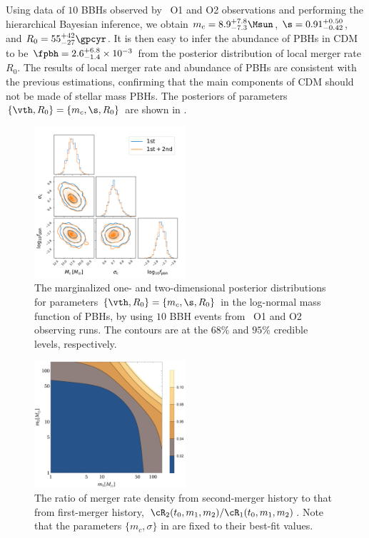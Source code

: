 \documentclass[
reprint,           %
superscriptaddress,%
amsmath,           %
amssymb,           %
aps,               %
prd,               %
notitlepage,       %
longbibliography,  %
floatfix,          %
showkeys,          %
]{revtex4-1}
\begin{document}
Using data of $10$ BBHs observed by \lvc\ O1 and O2 observations and performing
the hierarchical Bayesian inference, we obtain $m_c =8.9^{+7.8}_{-7.3} \Msun$,
$\s = 0.91^{+0.50}_{-0.42}$, and $R_0 = 55^{+42}_{-27} \gpcyr$.
It is then easy to infer the abundance of PBHs in CDM to be 
$\fpbh = 2.6^{+6.8}_{-1.4} \times 10^{-3}$ from the posterior distribution of 
local merger rate $R_0$.
The results of local merger rate and abundance of PBHs are consistent with
the previous estimations, confirming that the main components of CDM should
not be made of stellar mass PBHs.
The posteriors of parameters $\{\vth, R_0\} = \{m_c, \s, R_0\}$ are shown 
in .
\begin{figure}[htbp!]
	\centering
	\includegraphics[width=0.5\textwidth]{post-log.pdf}
	\caption{\label{posterior-log}
		The marginalized one- and two-dimensional posterior distributions for 
		parameters $\{\vth, R_0\} = \{m_c, \s, R_0\}$ in the log-normal mass function of PBHs, by using $10$ BBH events from \lvc\ O1 and O2 observing runs.
		The contours are at the $68\%$ and $95\%$ credible levels, respectively. 
	}
\end{figure}

\begin{figure}[htbp!]
	\centering
	\includegraphics[width=0.5\textwidth]{ratio-log.pdf}
	\caption{\label{ratio-log}
		The ratio of merger rate density from second-merger history
		to that from first-merger history,
		$\cR_2(t_0, m_1, m_2)/\cR_1(t_0, m_1, m_2)$. Note that the parameters $\{m_c, \sigma\}$ in  are fixed to their best-fit values.
	}
\end{figure}
\end{document}
